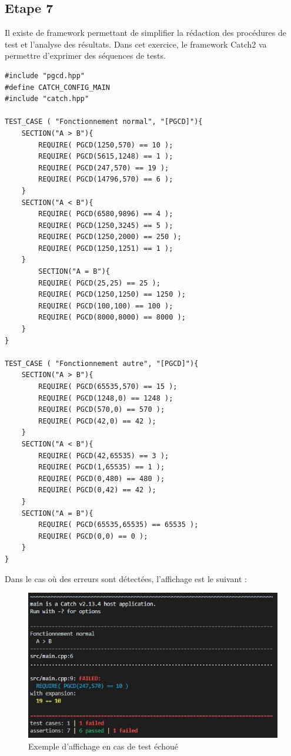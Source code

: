 \documentclass[a4paper]{article}
\begin{document}
    \subsection{Etape 7}
        Il existe de framework permettant de simplifier la rédaction des procédures de test et l'analyse des résultats.
        Dans cet exercice, le framework Catch2 va permettre d'exprimer des séquences de tests.
\begin{lstlisting}[style=CStyle]
#include "pgcd.hpp"
#define CATCH_CONFIG_MAIN
#include "catch.hpp"

TEST_CASE ( "Fonctionnement normal", "[PGCD]"){
    SECTION("A > B"){
        REQUIRE( PGCD(1250,570) == 10 );
        REQUIRE( PGCD(5615,1248) == 1 );
        REQUIRE( PGCD(247,570) == 19 );
        REQUIRE( PGCD(14796,570) == 6 );
    }
    SECTION("A < B"){
        REQUIRE( PGCD(6580,9896) == 4 );
        REQUIRE( PGCD(1250,3245) == 5 );
        REQUIRE( PGCD(1250,2000) == 250 );
        REQUIRE( PGCD(1250,1251) == 1 );
    }
        SECTION("A = B"){
        REQUIRE( PGCD(25,25) == 25 );
        REQUIRE( PGCD(1250,1250) == 1250 );
        REQUIRE( PGCD(100,100) == 100 );
        REQUIRE( PGCD(8000,8000) == 8000 );
    }
}

TEST_CASE ( "Fonctionnement autre", "[PGCD]"){
    SECTION("A > B"){
        REQUIRE( PGCD(65535,570) == 15 );
        REQUIRE( PGCD(1248,0) == 1248 );
        REQUIRE( PGCD(570,0) == 570 );
        REQUIRE( PGCD(42,0) == 42 );
    }
    SECTION("A < B"){
        REQUIRE( PGCD(42,65535) == 3 );
        REQUIRE( PGCD(1,65535) == 1 );
        REQUIRE( PGCD(0,480) == 480 );
        REQUIRE( PGCD(0,42) == 42 );
    }
    SECTION("A = B"){
        REQUIRE( PGCD(65535,65535) == 65535 );
        REQUIRE( PGCD(0,0) == 0 );
    }
}    
\end{lstlisting}        
        Dans le cas où des erreurs sont détectées, l'affichage est le suivant :
        \begin{figure}[H]
            \centering
            \includegraphics[scale=0.6]{Pictures/test_failed.jpg}
            \caption{Exemple d'affichage en cas de test échoué}
            \label{fig:Test_failed}
        \end{figure}
\end{document}
